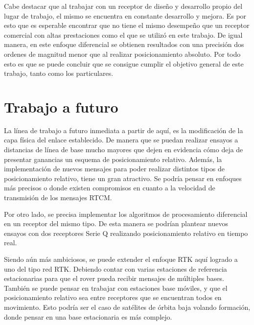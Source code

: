 \documentclass[a4paper,12pt,oneside,onecolumn,final,openright]{book}%
\begin{document}
	Cabe destacar que al trabajar con un receptor de diseño y desarrollo propio del lugar de trabajo, el mismo se encuentra en constante desarrollo y mejora. Es por esto que es esperable encontrar que no tiene el mismo desempeño que un receptor comercial con altas prestaciones como el que se utilizó en este trabajo. De igual manera, en este enfoque diferencial se obtienen resultados con una precisión dos ordenes de magnitud menor que al realizar posicionamiento absoluto. Por todo esto es que se puede concluir que se consigue cumplir el objetivo general de este trabajo, tanto como los particulares. 
	
\section*{Trabajo a futuro}
	La línea de trabajo a futuro inmediata a partir de aquí, es la modificación de la capa física del enlace establecido. De manera que se puedan realizar ensayos a distancias de línea de base mucho mayores que dejen en evidencia cómo deja de presentar ganancias un esquema de posicionamiento relativo. Además, la implementación de nuevos mensajes para poder realizar distintos tipos de posicionamiento relativo, tiene un gran atractivo. Se podría pensar en enfoques más precisos o donde existen compromisos en cuanto a la velocidad de transmisión de los mensajes RTCM.
	
	Por otro lado, se precisa implementar los algoritmos de procesamiento diferencial en un receptor del mismo tipo. De esta manera se podrían plantear nuevos ensayos con dos receptores Serie Q realizando posicionamiento relativo en tiempo real. 
	
	Siendo aún más ambiciosos, se puede extender el enfoque RTK aquí logrado a uno del tipo red RTK. Debiendo contar con varias estaciones de referencia estacionarias para que el rover pueda recibir mensajes de múltiples bases. También se puede pensar en trabajar con estaciones base móviles, y que el posicionamiento relativo sea entre receptores que se encuentran todos en movimiento. Esto podría ser el caso de satélites de órbita baja volando formación, donde pensar en una base estacionaria es más complejo.
\end{document}
